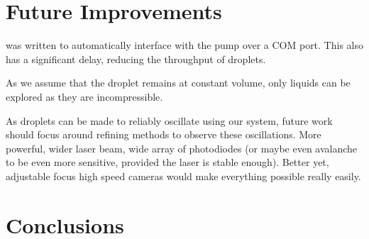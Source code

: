 \documentclass{physics_article_B}
\begin{document}
\section{Future Improvements}

was written to automatically interface with the pump over a COM port. This also has a significant delay, reducing the throughput of droplets.

As we assume that the droplet remains at constant volume, only liquids can be explored as they are incompressible.

As droplets can be made to reliably oscillate using our system, future work should focus around refining methods to observe these oscillations. More powerful, wider laser beam, wide array of photodiodes (or maybe even avalanche to be even more sensitive, provided the laser is stable enough). Better yet, adjustable focus high speed cameras would make everything possible really easily.

\section{Conclusions}

\newpage



\end{document}

